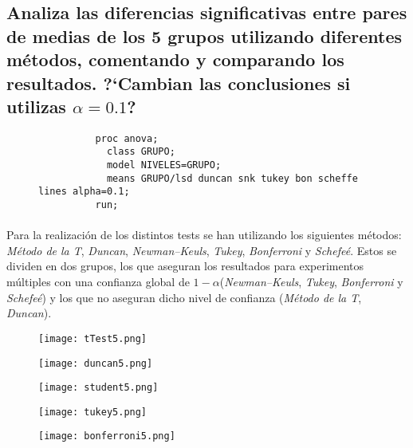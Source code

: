 \documentclass{article}
\begin{document}
    \subsection{Analiza las diferencias significativas entre pares de medias de los 5 grupos utilizando diferentes métodos, comentando y comparando los resultados. ?`Cambian las conclusiones si utilizas $\alpha = 0.1$?}

      \begin{figure}[h]
        \centering
        \begin{verbatim}
          proc anova;
            class GRUPO;
            model NIVELES=GRUPO;
            means GRUPO/lsd duncan snk tukey bon scheffe lines alpha=0.1;
          run;
        \end{verbatim}
        \label{code:sas_5}
      \end{figure}

      \paragraph{}
      Para la realización de los distintos tests se han utilizando los siguientes métodos: \emph{Método de la T}, \emph{Duncan}, \emph{Newman–Keuls}, \emph{Tukey}, \emph{Bonferroni} y \emph{Schefeé}. Estos se dividen en dos grupos, los que aseguran los resultados para experimentos múltiples con una confianza global de $1-\alpha$(\emph{Newman–Keuls}, \emph{Tukey}, \emph{Bonferroni} y \emph{Schefeé}) y los que no aseguran dicho nivel de confianza (\emph{Método de la T}, \emph{Duncan}).

      \begin{figure}[H]
        \centering
        \texttt{[image: tTest5.png]}
      \end{figure}
      \begin{figure}[H]
        \centering
        \texttt{[image: duncan5.png]}
      \end{figure}
      \begin{figure}[H]
        \centering
        \texttt{[image: student5.png]}
      \end{figure}

      \begin{figure}[H]
        \centering
        \texttt{[image: tukey5.png]}
      \end{figure}

      \begin{figure}[H]
        \centering
        \texttt{[image: bonferroni5.png]}
      \end{figure}
\end{document}
